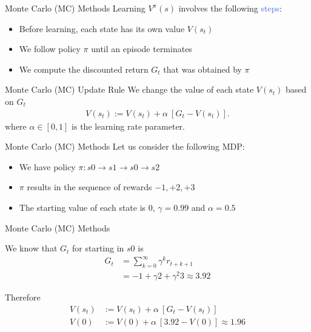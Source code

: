 \documentclass{beamer}
\begin{document}
\begin{frame}{Monte Carlo (MC) Methods}
	Learning $V^{\pi}(s)$ involves the following \textcolor{RoyalBlue}{steps}:
	\begin{itemize}
		\item Before learning, each state has its own value $V(s_t)$
		\item We follow policy $\pi$ until an episode terminates 
		\item We compute the discounted return $G_t$ that was obtained by $\pi$
	\end{itemize}

	\begin{block}{Monte Carlo (MC) Update Rule}
		We change the value of each state $V(s_t)$ based on $G_t$
		\begin{align*}
			V(s_t) := V(s_t) + \alpha \:[G_t-V(s_t)].
		\end{align*}
		where $\alpha \in [0,1]$ is the learning rate parameter.
	\end{block}

\end{frame}


\begin{frame}{Monte Carlo (MC) Methods}
	Let us consider the following MDP:

	\centering
	

	\begin{itemize}
		\item We have policy $\pi: s0\rightarrow s1 \rightarrow s0 \rightarrow s2$
		\item $\pi$ results in the sequence of rewards $-1, +2, +3$
		\item The starting value of each state is $0$, $\gamma=0.99$ and $\alpha=0.5$
	\end{itemize}
	
\end{frame}


\begin{frame}{Monte Carlo (MC) Methods}
	
	We know that $G_t$ for starting in $s0$ is 
	\begin{align*}
		G_t & = \sum_{k=0}^{\infty}\gamma^{k} r_{t+k+1} \\ 
		    & = -1+\gamma2+\gamma^{2}3 \approx 3.92
	\end{align*}

	Therefore
	\begin{align*}
		V(s_t) & := V(s_t) + \alpha \:[G_t-V(s_t)] \\
		V(0) & := V(0) + \alpha \:[3.92-V(0)] \approx 1.96
	\end{align*}

\end{frame}
\end{document}
